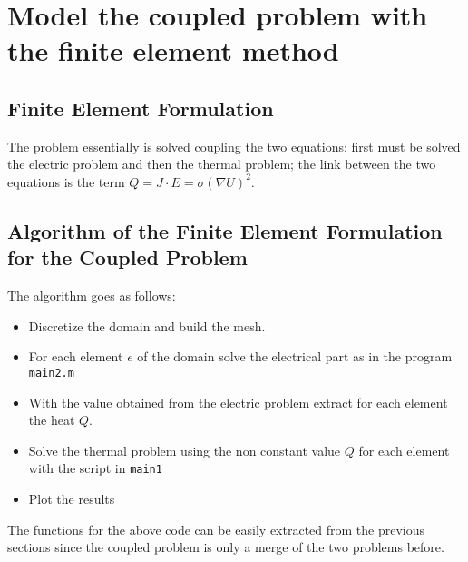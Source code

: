 \section{Model the coupled problem with the finite element method}
\subsection{Finite Element Formulation}
The problem essentially is solved coupling the two equations: first must be solved the electric problem and then the thermal problem; the link between the two equations is the term $ Q = J\cdot E=\sigma(\nabla U)^2. $ 

\subsection{Algorithm of the Finite Element Formulation for the Coupled Problem}
\begin{mdframed}
	The algorithm goes as follows:
	\begin{itemize}
		\item Discretize the domain and build the mesh.
		\item For each element $ e $ of the domain solve the electrical part as in the program \texttt{main2.m}
		\item With the value obtained from the electric problem extract for each element the heat $ Q $.
		\item Solve the thermal problem using the non constant value $ Q $ for each element with the script in \texttt{main1}
		\item Plot the results
	\end{itemize}
\end{mdframed}



The functions for the above code can be easily extracted from the previous sections since the coupled problem is only a merge of the two problems before.

